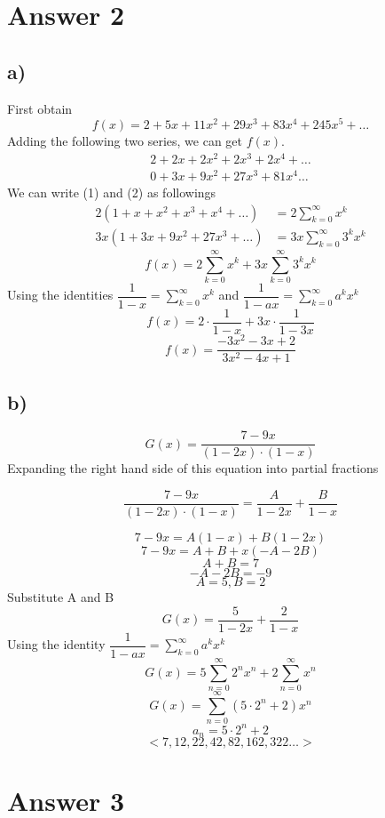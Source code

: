\documentclass[12pt]{article}
\begin{document}
\section*{Answer 2}
\subsection*{a) }
First obtain
$$f(x) = 2 + 5x + 11x^2 + 29x^3 + 83x^4 + 245x^5  +\dots $$
Adding the following two series, we can get $f(x)$.
\begin{align}
    2 + 2x + 2x^2 + 2x^3 + 2x^4 +\dots \\
    0 + 3x + 9x^2 + 27x^3 + 81x^4 \dots 
\end{align}
We can write (1) and (2) as followings 
\setcounter{equation}{0}
\begin{align}
    2(1+x+x^2+x^3+x^4+\dots) &= 2 \sum_{k=0}^\infty x^k \\ 
    3x(1+3x+9x^2+27x^3+ \dots) &= 3x \sum_{k=0}^\infty 3^k x^k
\end{align}
$$f(x) = 2 \sum_{k=0}^\infty x^k + 3x \sum_{k=0}^\infty 3^k x^k$$
Using the identities $\dfrac{1}{1-x} = \sum_{k=0}^\infty x^k$ and $\dfrac{1}{1-ax} = \sum_{k=0}^\infty a^kx^k$
$$f(x) = 2 \cdot \dfrac{1}{1-x} + 3x \cdot \dfrac{1}{1-3x}$$
$$f(x) = \dfrac{-3x^2 -3x +2}{3x^2-4x+1}$$


\subsection*{b) }
$$G(x) = \dfrac{7-9x}{(1-2x)\cdot(1-x)}$$
Expanding the right hand side of this equation into partial fractions

$$\dfrac{7-9x}{(1-2x)\cdot(1-x)} = \dfrac{A}{1-2x} + \dfrac{B}{1-x} $$

$$7-9x = A(1-x) + B(1-2x) $$
$$7-9x = A + B + x(-A-2B) $$
$$A + B = 7$$
$$-A-2B = -9$$
$$A=5, B=2$$
Substitute A and B
$$G(x) = \dfrac{5}{1-2x} + \dfrac{2}{1-x}$$
Using the identity $\dfrac{1}{1-ax} = \sum_{k=0}^\infty a^kx^k$
$$G(x) = 5\sum_{n=0}^\infty 2^nx^n + 2\sum_{n=0}^\infty x^n$$
$$G(x) = \sum_{n=0}^\infty (5\cdot2^n + 2) x^n$$
$$a_n = 5\cdot2^n + 2$$
$$<7, 12, 22, 42, 82, 162,322 \dots>$$

\section*{Answer 3}
\end{document}
